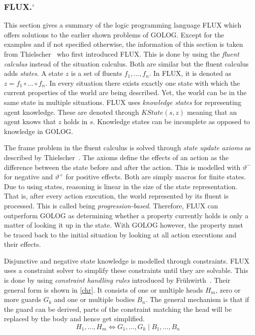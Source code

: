 \subsubsection[FLUX.]{FLUX.$^\circ$}\label{fun:apl_flux}
This section gives a summary of the logic programming language FLUX which offers solutions to the earlier shown problems of GOLOG.
Except for the examples and if not specified otherwise, the information of this section is taken from Thielscher~\cite{thielscher_flux:_2005} who first introduced FLUX.
This is done by using the \emph{fluent calculus} instead of the situation calculus.
Both are similar but the fluent calculus adds \emph{states}.
A state $z$ is a set of fluents $f_1,\dotsc,f_n$.
In FLUX, it is denoted as $z = f_1 \circ\dotsc\circ f_n$.
In every situation there exists exactly one state with which the current properties of the world are being described.
Yet, the world can be in the same state in multiple situations.
FLUX uses \emph{knowledge states} for representing agent knowledge.
These are denoted through $\textit{KState}(s,z)$ meaning that an agent knows that $z$ holds in $s$.
Knowledge states can be incomplete as opposed to knowledge in GOLOG.

The frame problem in the fluent calculus is solved through \emph{state update axioms} as described by Thielscher~\cite{thielscher_situation_1999}.
The axioms define the effects of an action as the difference between the state before and after the action.
This is modelled with $\vartheta^-$ for negative and $\vartheta^+$ for positive effects.
Both are simply macros for finite states.
Due to using states, reasoning is linear in the size of the state representation.
That is, after every action execution, the world represented by its fluent is processed.
This is called being \emph{progression-based}.
Therefore, FLUX can outperform GOLOG as determining whether a property currently holds is only a matter of looking it up in the state.
With GOLOG however, the property must be traced back to the initial situation by looking at all action executions and their effects. %

Disjunctive and negative state knowledge is modelled through constraints.
FLUX uses a constraint solver to simplify these constraints until they are solvable.
This is done by using \emph{constraint handling rules} introduced by Frühwirth~\cite{fruhwirth_theory_1998}.
Their general form is shown in \autoref{chr}.
It consists of one or multiple heads $H_m$, zero or more guards $G_k$ and one or multiple bodies $B_n$.
The general mechanism is that if the guard can be derived, parts of the constraint matching the head will be replaced by the body and hence get simplified.
\begin{equation}\label{chr}
  H_1,\ldots,H_m\Leftrightarrow G_1,\ldots,G_k \mid B_1,\ldots,B_n
\end{equation}

